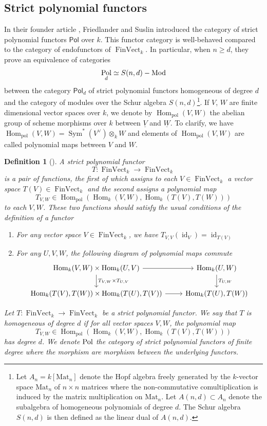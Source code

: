 \documentclass[11pt]{amsart}
\numberwithin{subsection}{section}
\numberwithin{figure}{section}
\numberwithin{table}{section}
\theoremstyle{1}
\newtheorem{definition}[theorem]{Definition}
\theoremstyle{2}
\DeclareMathOperator{\FinVect}{FinVect}
\DeclareMathOperator{\Hom}{Hom}
\DeclareMathOperator{\Sym}{Sym}
\DeclareMathOperator{\Mod}{Mod}
\DeclareMathOperator{\pol}{pol}
\DeclareMathOperator{\id}{id}
\DeclareMathOperator{\Pol}{\normalfont \textsf{Pol}}
\begin{document}
\subsection{Strict polynomial functors}
In their founder article \cite{MR1427618}, Friedlander and Suslin introduced the category of strict polynomial functors $\textsf{Pol}$ over $k$. This functor category is well-behaved compared to the category of endofunctors of $\FinVect_k$. In particular, when $n\geq d$, they prove an equivalence of categories
\begin{equation*}
\Pol_d\simeq S(n,d)-\Mod
\end{equation*}
between the category $\textsf{Pol}_d$ of strict polynomial functors homogeneous of degree $d$ and the category of modules over the Schur algebra $S(n,d)$\footnote{Let $A_n = k[\text{Mat}_n]$ denote the Hopf algebra freely generated by the $k$-vector space $\text{Mat}_n$ of $n\times n$ matrices where the non-commutative comultiplication is induced by the matrix multiplication on $\text{Mat}_n$. Let  $A(n,d) \subset A_n$ denote the subalgebra of homogeneous polynomials of degree $d$. The Schur algebra $S(n,d)$ is then defined as the linear dual of $A(n,d)$.}. If $V$, $W$ are finite dimensional vector spaces over $k$, we denote by $\Hom_{\pol}(V,W)$ the abelian group of scheme morphisms over $k$ between $\underline{V}$ and $\underline{W}$. To clarify, we have $\Hom_{\pol}(V,W) = \Sym^*(V^{\vee})\otimes_k W$ and elements of $\Hom_{\pol}(V,W)$ are called polynomial maps between $V$ and $W$.
\begin{definition}[{\cite[Definition 2.1]{MR1427618}}]
A strict polynomial functor $$T : \FinVect_k \rightarrow \FinVect_k$$ is a pair of functions, the first of which assigns to each $V \in \FinVect_k$ a vector space $T(V) \in \FinVect_k$ and the second assigns a polynomial map $$T_{V,W} \in \Hom_{\pol}(\Hom_k(V,W),\Hom_k(T(V),T(W)))$$ to each $V,W$. These two functions should satisfy the usual conditions of the definition of a functor
\begin{enumerate}
\item For any vector space $V \in \FinVect_k$, we have $T_{V,V}(\id_V) = \id_{T(V)}$
\item For any $U,V,W$, the following diagram of polynomial maps commute
\begin{equation*}
\begin{tikzcd}
\Hom_k(V,W) \times \Hom_k(U,V) \arrow[d,"T_{V,W}\times T_{U,V}"] \arrow[r] & \Hom_k(U,W) \arrow[d,"T_{U,W}"] \\
\Hom_k(T(V),T(W)) \times \Hom_k(T(U),T(V)) \arrow[r] & \Hom_k(T(U),T(W))
\end{tikzcd}
\end{equation*}
\end{enumerate}
Let $T : \FinVect_k \rightarrow \FinVect_k$ be a strict polynomial functor. We say that $T$ is homogeneous of degree $d$ if for all vector spaces $V,W$, the polynomial map
$$T_{V,W} \in \Hom_{\pol}(\Hom_k(V,W),\Hom_k(T(V),T(W)))$$
has degree $d$. We denote $\Pol$ the category of strict polynomial functors of finite degree where the morphism are morphism between the underlying functors.
\end{definition}
\end{document}
